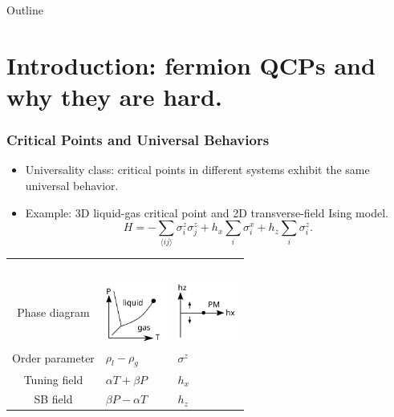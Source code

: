 \documentclass[xcolor=table, 10pt, aspectratio=43]{beamer}
\renewcommand{\arraystretch}{1.5}
\begin{document}
\begin{frame}{Outline}
		\tableofcontents
\end{frame}

\section{Introduction: fermion QCPs and why they are hard.}

\begin{frame}
  \frametitle{Critical Points and Universal Behaviors}
  \begin{itemize}
  \item Universality class: critical points in different systems exhibit the same universal behavior.
  \item Example: 3D liquid-gas critical point and 2D transverse-field Ising model.
  \[H = -\sum_{\langle ij\rangle}\sigma_i^z\sigma_j^z+h_x\sum_i\sigma_i^x
  +h_z\sum_i\sigma_i^z.\]
\end{itemize}
  \begin{table}
    \centering
    \renewcommand{\arraystretch}{1.5}
    \begin{tabularx}{\columnwidth}{cxx}
      &\textcolor{white}{Liquid-gas}&\textcolor{white}{TFIM}\\
      Phase diagram & \includegraphics[width=2cm]{liquidgas} &\includegraphics[width=2cm]{tfim}\\
      Order parameter & $\rho_l-\rho_g$ & $\sigma^z$\\
      Tuning field & $\alpha T+\beta P$ & $h_x$\\
      SB field & $\beta P-\alpha T$ & $h_z$
    \end{tabularx}
  \end{table}
\end{frame}
\end{document}
